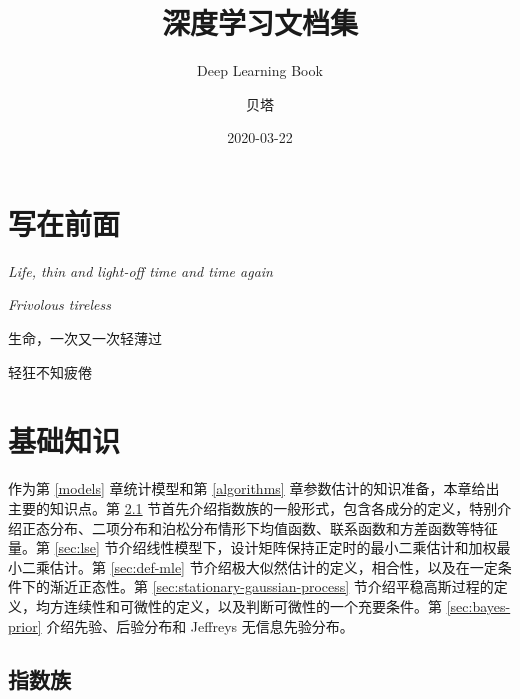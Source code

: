 \documentclass[12pt,a4paper,UTF8,twoside]{book}
\title{深度学习文档集}
\subtitle{Deep Learning Book}
\author{贝塔}
\date{2020-03-22}
\theoremstyle{definition}
\theoremstyle{definition}
\theoremstyle{definition}
\theoremstyle{remark}
\begin{document}





{
\setcounter{tocdepth}{2}
\tableofcontents
}

\hypertarget{ux5199ux5728ux524dux9762}{%
\chapter{写在前面}\label{ux5199ux5728ux524dux9762}}

\emph{Life, thin and light-off time and time again}

\emph{Frivolous tireless}

生命，一次又一次轻薄过

轻狂不知疲倦

\hypertarget{prepare}{%
\chapter{基础知识}\label{prepare}}

作为第 \ref{models} 章统计模型和第 \ref{algorithms} 章参数估计的知识准备，本章给出主要的知识点。第 \ref{sec:exp} 节首先介绍指数族的一般形式，包含各成分的定义，特别介绍正态分布、二项分布和泊松分布情形下均值函数、联系函数和方差函数等特征量。第 \ref{sec:lse} 节介绍线性模型下，设计矩阵保持正定时的最小二乘估计和加权最小二乘估计。第 \ref{sec:def-mle} 节介绍极大似然估计的定义，相合性，以及在一定条件下的渐近正态性。第 \ref{sec:stationary-gaussian-process} 节介绍平稳高斯过程的定义，均方连续性和可微性的定义，以及判断可微性的一个充要条件。第 \ref{sec:bayes-prior} 介绍先验、后验分布和 Jeffreys 无信息先验分布。

\hypertarget{sec:exp}{%
\section{指数族}\label{sec:exp}}
\end{document}
